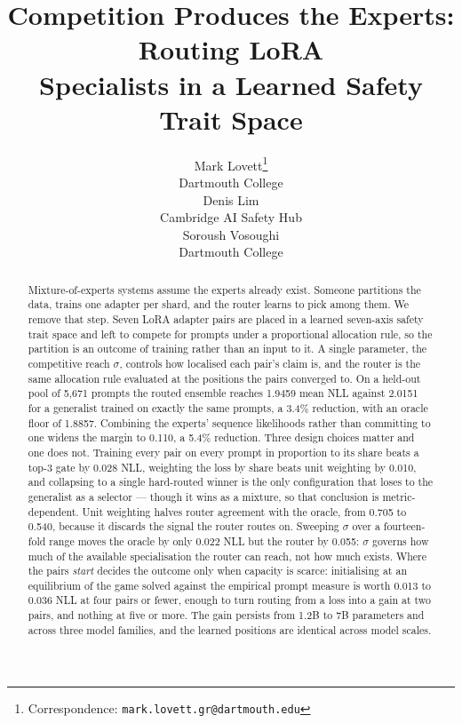 \documentclass{article}
\title{Competition Produces the Experts: Routing LoRA\\Specialists in a Learned Safety Trait Space}
\author{
  Mark Lovett\thanks{Correspondence: \texttt{mark.lovett.gr@dartmouth.edu}} \\
  Dartmouth College \\
  \And
  Denis Lim \\
  Cambridge AI Safety Hub \\
  \And
  Soroush Vosoughi \\
  Dartmouth College
}
\begin{document}
\maketitle

\begin{abstract}
Mixture-of-experts systems assume the experts already exist. Someone partitions the data, trains one
adapter per shard, and the router learns to pick among them. We remove that step. Seven LoRA adapter
pairs are placed in a learned seven-axis safety trait space and left to compete for prompts under a
proportional allocation rule, so the partition is an outcome of training rather than an input to it.
A single parameter, the competitive reach $\sigma$, controls how localised each pair's claim is, and
the router is the same allocation rule evaluated at the positions the pairs converged to.
On a held-out pool of 5{,}671 prompts the routed ensemble reaches 1.9459 mean NLL against 2.0151 for
a generalist trained on exactly the same prompts, a 3.4\% reduction, with an oracle floor of 1.8857.
Combining the experts' sequence likelihoods rather than committing to one widens the margin to 0.110,
a 5.4\% reduction. Three design choices matter and one does not. Training every pair on every prompt
in proportion to its share beats a top-3 gate by 0.028 NLL, weighting the loss by share beats unit
weighting by 0.010, and collapsing to a single hard-routed winner is the only configuration that
loses to the generalist as a selector --- though it wins as a mixture, so that conclusion is
metric-dependent. Unit weighting halves router agreement with the oracle, from 0.705 to 0.540,
because it discards the signal the router routes on. Sweeping $\sigma$ over a fourteen-fold range
moves the oracle by only 0.022 NLL but the router by 0.055: $\sigma$ governs how much of the
available specialisation the router can reach, not how much exists. Where the pairs \emph{start}
decides the outcome only when capacity is scarce: initialising at an equilibrium of the game solved
against the empirical prompt measure is worth 0.013 to 0.036 NLL at four pairs or fewer, enough to
turn routing from a loss into a gain at two pairs, and nothing at five or more. The gain persists
from 1.2B to 7B parameters and across three model families, and the learned positions are identical
across model scales.
\end{abstract}
\end{document}
